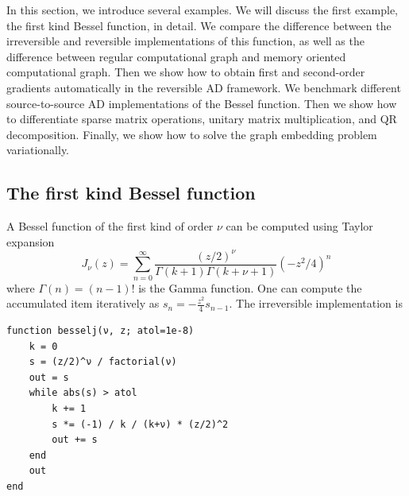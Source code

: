 \documentclass{article}
\newcommand{\<}{\langle}
\renewcommand{\>}{\rangle}
\theoremstyle{definition}\newtheorem{definition}{\textit{Definition}}
\begin{document}
In this section, we introduce several examples.
We will discuss the first example, the first kind Bessel function, in detail.
We compare the difference between the irreversible and reversible implementations of this function, as well as the difference between regular computational graph and memory oriented computational graph.
Then we show how to obtain first and second-order gradients automatically in the reversible AD framework.
We benchmark different source-to-source AD implementations of the Bessel function.
Then we show how to differentiate sparse matrix operations, unitary matrix multiplication, and QR decomposition.
Finally, we show how to solve the graph embedding problem variationally.

\subsection{The first kind Bessel function}\label{sec:bessel}
A Bessel function of the first kind of order $\nu$ can be computed using Taylor expansion
\begin{equation}
    J_\nu(z) = \sum\limits_{n=0}^{\infty} \frac{(z/2)^\nu}{\Gamma(k+1)\Gamma(k+\nu+1)} (-z^2/4)^{n}
\end{equation}
where $\Gamma(n) = (n-1)!$ is the Gamma function. One can compute the accumulated item iteratively as $s_n = -\frac{z^2}{4} s_{n-1}$. The irreversible implementation is

\begin{minipage}{.88\columnwidth}
\begin{lstlisting}
function besselj(ν, z; atol=1e-8)
    k = 0
    s = (z/2)^ν / factorial(ν)
    out = s
    while abs(s) > atol
        k += 1
        s *= (-1) / k / (k+ν) * (z/2)^2
        out += s
    end
    out
end
\end{lstlisting}
\end{minipage}
\end{document}
